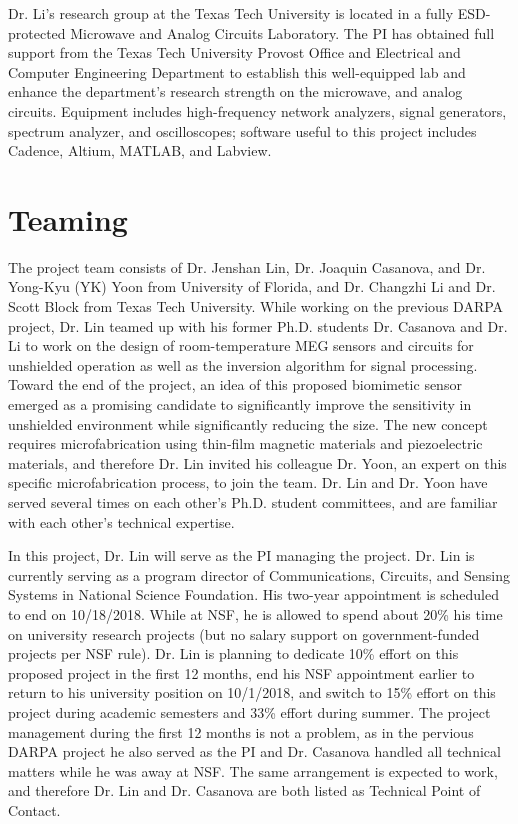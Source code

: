 Dr. Li's research group at the Texas Tech University is located in a fully ESD-protected Microwave and Analog Circuits Laboratory. The PI has obtained full support from the Texas Tech University Provost Office and Electrical and Computer Engineering Department to establish this well-equipped lab and enhance the department’s research strength on the microwave, and analog circuits. Equipment includes high-frequency network analyzers, signal generators, spectrum analyzer, and oscilloscopes; software useful to this project includes Cadence, Altium, MATLAB, and Labview.

\section{Teaming}
The project team consists of Dr. Jenshan Lin, Dr. Joaquin Casanova, and Dr. Yong-Kyu (YK) Yoon from University of Florida, and Dr. Changzhi Li and Dr. Scott Block from Texas Tech University. While working on the previous DARPA project, Dr. Lin teamed up with his former Ph.D. students Dr. Casanova and Dr. Li to work on the design of room-temperature MEG sensors and circuits for unshielded operation as well as the inversion algorithm for signal processing. Toward the end of the project, an idea of this proposed biomimetic sensor emerged as a promising candidate to significantly improve the sensitivity in unshielded environment while significantly reducing the size. The new concept requires microfabrication using thin-film magnetic materials and piezoelectric materials, and therefore Dr. Lin invited his colleague Dr. Yoon, an expert on this specific microfabrication process, to join the team. Dr. Lin and Dr. Yoon have served several times on each other's Ph.D. student committees, and are familiar with each other’s technical expertise.

In this project, Dr. Lin will serve as the PI managing the project. Dr. Lin is currently serving as a program director of Communications, Circuits, and Sensing Systems in National Science Foundation. His two-year appointment is scheduled to end on 10/18/2018. While at NSF, he is allowed to spend about 20\% his time on university research projects (but no salary support on government-funded projects per NSF rule). Dr. Lin is planning to dedicate 10\% effort on this proposed project in the first 12 months, end his NSF appointment earlier to return to his university position on 10/1/2018, and switch to 15\% effort on this project during academic semesters and 33\% effort during summer. The project management during the first 12 months is not a problem, as in the pervious DARPA project he also served as the PI and Dr. Casanova handled all technical matters while he was away at NSF. The same arrangement is expected to work, and therefore Dr. Lin and Dr. Casanova are both listed as Technical Point of Contact. 

